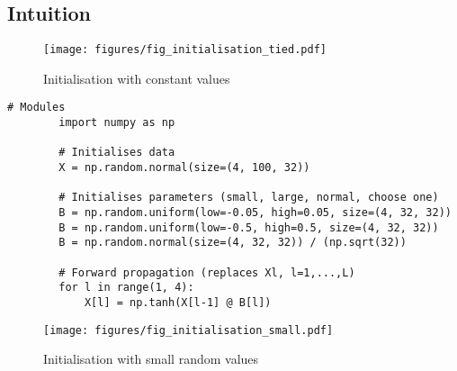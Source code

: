 \documentclass[c]{beamer}
\begin{document}
\subsection{Intuition}

\begin{frame}{\secsubname}
	\begin{figure}
		\begin{minipage}{.64\textwidth}
			\texttt{[image: figures/fig\_initialisation\_tied.pdf]}
		\end{minipage}
		\hfill
		\begin{minipage}{.34\textwidth}
			\caption{Initialisation with constant values}
		\end{minipage}
	\end{figure}
\end{frame}

\begin{frame}[fragile]{\secname}
	\begin{lstlisting}[caption=Random initialisations, basicstyle=\scriptsize, numberstyle=\scriptsize]
		# Modules
		import numpy as np

		# Initialises data
		X = np.random.normal(size=(4, 100, 32))

		# Initialises parameters (small, large, normal, choose one)
		B = np.random.uniform(low=-0.05, high=0.05, size=(4, 32, 32))
		B = np.random.uniform(low=-0.5, high=0.5, size=(4, 32, 32))
		B = np.random.normal(size=(4, 32, 32)) / (np.sqrt(32))

		# Forward propagation (replaces Xl, l=1,...,L)
		for l in range(1, 4):
		    X[l] = np.tanh(X[l-1] @ B[l])
	\end{lstlisting}
\end{frame}

\begin{frame}{\secsubname}
	\begin{figure}
		\caption{Initialisation with small random values}
		\texttt{[image: figures/fig\_initialisation\_small.pdf]}
	\end{figure}
\end{frame}
\end{document}
